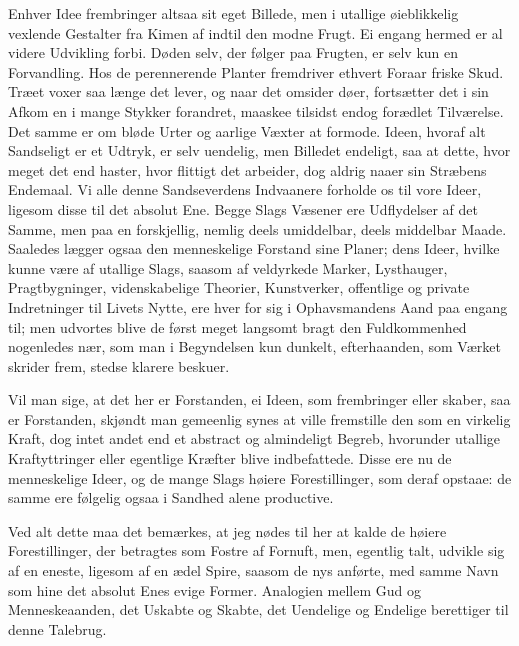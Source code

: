 \documentclass[12pt,a4paper]{article}
\newcommand{\opage}[1]{\marginnote{\footnotesize\textit{[#1]}}}
\begin{document}
Enhver Idee frembringer altsaa sit eget Billede, men i utallige øieblikkelig
vexlende Gestalter fra Kimen af indtil den modne Frugt. Ei engang hermed er al
videre Udvikling forbi. Døden selv, der følger paa Frugten, er selv kun en
Forvandling. Hos de perennerende Planter fremdriver ethvert Foraar friske Skud.
Træet voxer saa længe det lever, og naar det omsider døer, fortsætter det i sin
Afkom en i mange Stykker forandret, maaskee tilsidst endog forædlet Tilværelse.
Det samme er om bløde Urter og aarlige Væxter at formode. Ideen, hvoraf alt
Sandseligt er et Udtryk, er selv uendelig, men Billedet endeligt, saa at dette,
hvor meget det end haster, hvor flittigt det arbeider, dog aldrig naaer sin
Stræbens Endemaal. Vi alle denne Sandseverdens Indvaanere forholde os til vore
Ideer, ligesom disse til det absolut Ene. Begge Slags Væsener ere Udflydelser af
det Samme, men paa en forskjellig, nemlig deels umiddelbar, deels middelbar
Maade. Saaledes lægger ogsaa den menneskelige Forstand sine Planer; dens Ideer,
hvilke kunne være af utallige Slags, saasom af veldyrkede Marker, Lysthauger,
Pragtbygninger, videnskabelige Theorier, Kunstverker, offentlige og private
Indretninger til Livets Nytte, ere hver
\opage{204} for sig i Ophavsmandens Aand paa engang til; men udvortes blive de først meget
langsomt bragt den Fuldkommenhed nogenledes nær, som man i Begyndelsen kun
dunkelt, efterhaanden, som Værket skrider frem, stedse klarere beskuer.

Vil man sige, at det her er Forstanden, ei Ideen, som frembringer eller skaber,
saa er Forstanden, skjøndt man gemeenlig synes at ville fremstille den som en
virkelig Kraft, dog intet andet end et abstract og almindeligt Begreb, hvorunder
utallige Kraftyttringer eller egentlige Kræfter blive indbefattede. Disse ere nu
de menneskelige Ideer, og de mange Slags høiere Forestillinger, som deraf
opstaae: de samme ere følgelig ogsaa i Sandhed alene productive.

Ved alt dette maa det bemærkes, at jeg nødes til her at kalde de høiere
Forestillinger, der betragtes som Fostre af Fornuft, men, egentlig talt, udvikle
sig af en eneste, ligesom af en ædel Spire, saasom de nys anførte, med samme Navn
som hine det absolut Enes evige Former. Analogien mellem Gud og
Menneskeaanden, det Uskabte og Skabte, det Uendelige og Endelige berettiger til
denne Talebrug.
\end{document}
